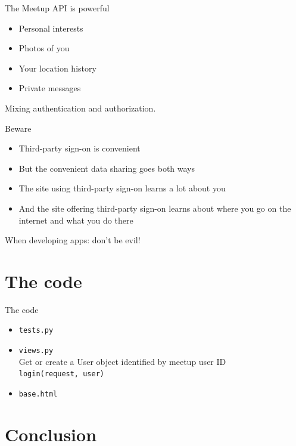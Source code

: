 \documentclass[xcolor=svgnames,17pt]{beamer}
\begin{document}
\begin{frame}{The Meetup API is powerful}
\begin{itemize}
\item Personal interests
\item Photos of you
\item Your location history
\item Private messages
\end{itemize}

Mixing authentication and authorization.
\end{frame}

\begin{frame}{Beware}
\begin{itemize}
\item Third-party sign-on is convenient
\pause
\item But the convenient data sharing goes both ways
\pause
\item The site using third-party sign-on learns a lot about you
\pause
\item And the site offering third-party sign-on learns about where you go
on the internet and what you do there
\end{itemize}
\pause
When developing apps: don’t be evil!
\end{frame}

\section{The code}

\begin{frame}{The code}
\begin{itemize}
\item \texttt{tests.py}
\pause
\item \texttt{views.py}
\\ Get or create a User object identified by meetup user ID
\\ \texttt{login(request, user)}
\item \texttt{base.html}
\end{itemize}
\end{frame}

\section{Conclusion}
\end{document}
